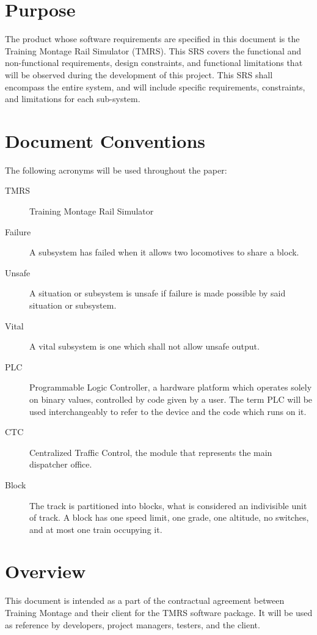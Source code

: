 \documentclass{scrreprt}
\begin{document}
\section{Purpose}
The product whose software requirements are specified in this document is the
Training Montage Rail Simulator (TMRS). This SRS covers the functional and
non-functional requirements, design constraints, and functional limitations that
will be observed during the development of this project. This SRS shall encompass
the entire system, and will include specific requirements, constraints, and
limitations for each sub-system.

\section{Document Conventions}
The following acronyms will be used throughout the paper:

\begin{description}
  \item[TMRS] Training Montage Rail Simulator
  \item[Failure] A subsystem has failed when it allows two locomotives to share a block.
  \item[Unsafe] A situation or subsystem is unsafe if failure is made possible by said situation or subsystem.
  \item[Vital] A vital subsystem is one which shall not allow unsafe output.
  \item[PLC] Programmable Logic Controller, a hardware platform which operates solely on binary values, controlled by code given by a user. The term PLC will be used interchangeably to refer to the device and the code which runs on it.
  \item[CTC] Centralized Traffic Control, the module that represents the main dispatcher office.
  \item[Block] The track is partitioned into blocks, what is considered an indivisible unit of track. A block has one speed limit, one grade, one altitude, no switches, and at most one train occupying it.
\end{description}

\section{Overview}
This document is intended as a part of the contractual agreement between Training
Montage and their client for the TMRS software package. It will be used as reference
by developers, project managers, testers, and the client.
\end{document}
